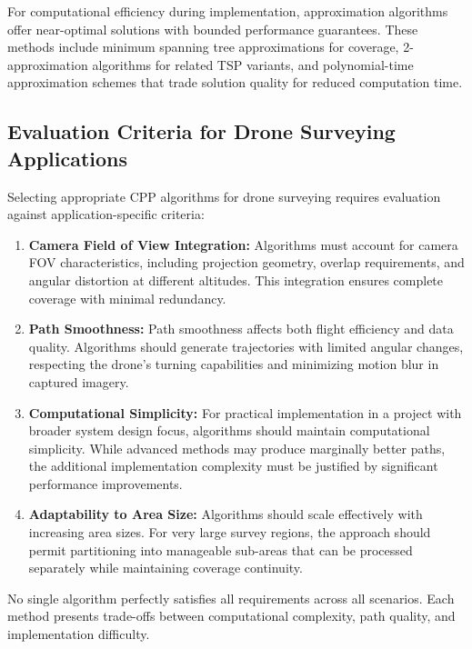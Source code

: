 For computational efficiency during implementation, approximation algorithms offer near-optimal solutions with bounded performance guarantees. These methods include minimum spanning tree approximations for coverage, 2-approximation algorithms for related TSP variants, and polynomial-time approximation schemes that trade solution quality for reduced computation time.


\subsection{Evaluation Criteria for Drone Surveying Applications}

Selecting appropriate CPP algorithms for drone surveying requires evaluation against application-specific criteria:
\begin{enumerate}
    \item \textbf{Camera Field of View Integration:} Algorithms must account for camera FOV characteristics, including projection geometry, overlap requirements, and angular distortion at different altitudes. This integration ensures complete coverage with minimal redundancy.
    \item \textbf{Path Smoothness:} Path smoothness affects both flight efficiency and data quality. Algorithms should generate trajectories with limited angular changes, respecting the drone's turning capabilities and minimizing motion blur in captured imagery.
    \item \textbf{Computational Simplicity:} For practical implementation in a project with broader system design focus, algorithms should maintain computational simplicity. While advanced methods may produce marginally better paths, the additional implementation complexity must be justified by significant performance improvements.
    \item \textbf{Adaptability to Area Size:} Algorithms should scale effectively with increasing area sizes. For very large survey regions, the approach should permit partitioning into manageable sub-areas that can be processed separately while maintaining coverage continuity.
\end{enumerate}

No single algorithm perfectly satisfies all requirements across all scenarios. Each method presents trade-offs between computational complexity, path quality, and implementation difficulty.

